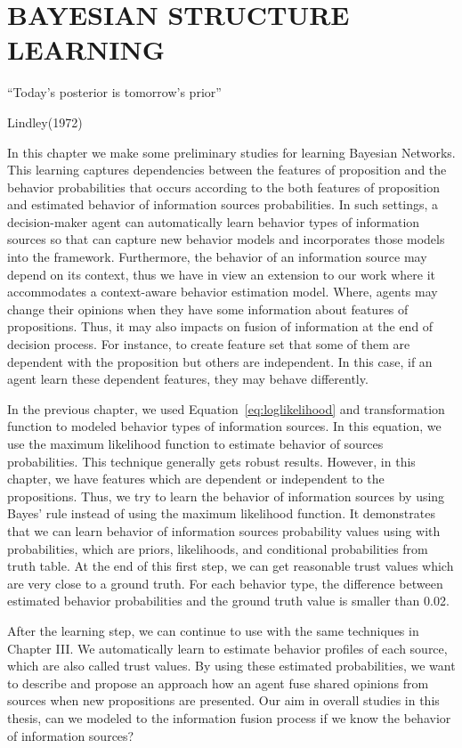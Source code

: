 \documentclass[a4,12pt]{ozu-thesis}
\begin{document}
\chapter{BAYESIAN STRUCTURE LEARNING}
\epigraph{``Today's posterior is tomorrow's prior''}{Lindley(1972)}
In this chapter we make some preliminary studies for learning Bayesian Networks. This learning captures dependencies between the features of proposition and the behavior probabilities that occurs according to the both features of proposition and estimated behavior of information sources probabilities. In such settings, a decision-maker agent can automatically learn behavior types of information sources so that can capture new behavior models and incorporates those models into the framework. Furthermore, the behavior of an information source may depend on its context, thus we have in view an extension to our work where it accommodates a context-aware behavior estimation model. Where, agents may change their opinions when they have some information about features of propositions. Thus, it may also impacts on fusion of information at the end of decision process. For instance, to create feature set that some of them are dependent with the proposition but others are independent. In this case, if an agent learn these dependent features, they may behave differently.


In the previous chapter, we used Equation~\ref{eq:loglikelihood} and transformation function to modeled behavior types of information sources. In this equation, we use the maximum likelihood function to estimate behavior of sources probabilities. This technique generally gets robust results. However, in this chapter, we have features which are dependent or independent to the propositions. Thus, we try to learn the behavior of information sources by using Bayes' rule instead of using the maximum likelihood function. It demonstrates that we can learn behavior of information sources probability values using with probabilities, which are priors, likelihoods, and conditional probabilities from truth table. At the end of this first step, we can get reasonable trust values which are very close to a ground truth. For each behavior type, the difference between estimated behavior probabilities and the ground truth value is smaller than 0.02. 

After the learning step, we can continue to use with the same techniques in Chapter III. We automatically learn to estimate behavior profiles of each source, which are also called trust values. By using these estimated probabilities, we want to describe and propose an approach how an agent fuse shared opinions from sources when new propositions are presented. Our aim in overall studies in this thesis, can we modeled to the information fusion process if we know the behavior of information sources?   
\end{document}
